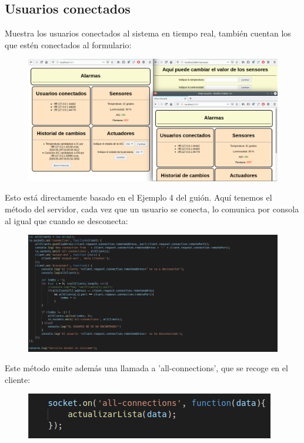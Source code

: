 \documentclass{article}
\begin{document}
	\subsection{Usuarios conectados}
	Muestra los usuarios conectados al sistema en tiempo real, también cuentan los que estén conectados al formulario:
	\begin{figure}[H]
		\centering
		\includegraphics[totalheight=6cm]{img/3.png}
	\end{figure}
	Esto está directamente basado en el Ejemplo 4 del guión. Aquí tenemos el método del servidor, cada vez que un usuario se conecta, lo comunica por consola al igual que cuando se desconecta:
	\begin{figure}[H]
		\centering
		\includegraphics[totalheight=6cm]{img/4.png}
	\end{figure}
	Este método emite además una llamada a 'all-connections', que se recoge en el cliente:
	\begin{figure}[H]
		\centering
		\includegraphics[totalheight=2.5cm]{img/5.png}
	\end{figure}
\end{document}
